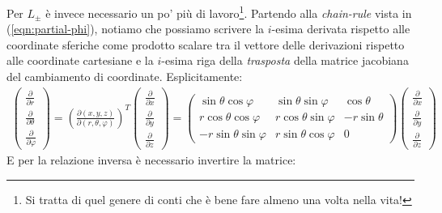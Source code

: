 \documentclass[../../FisicaTeorica.tex]{subfiles}
\begin{document}
Per $L_{\pm}$ è invece necessario un po' più di lavoro\footnote{Si tratta di quel genere di conti che è bene fare almeno una volta nella vita!}. Partendo alla \textit{chain-rule} vista in (\ref{eqn:partial-phi}), notiamo che possiamo scrivere la $i$-esima derivata rispetto alle coordinate sferiche come prodotto scalare tra il vettore delle derivazioni rispetto alle coordinate cartesiane e la $i$-esima riga della \textit{trasposta} della matrice jacobiana del cambiamento di coordinate. Esplicitamente:
\begin{align*}
\begin{pmatrix}
\frac{\partial}{\partial r}\\
\frac{\partial}{\partial \theta}\\
\frac{\partial}{\partial \varphi}
\end{pmatrix} = \left(\frac{\partial (x,y,z)}{\partial (r,\theta,\varphi)}\right)^T\begin{pmatrix}
\frac{\partial}{\partial x}\\
\frac{\partial}{\partial y}\\
\frac{\partial}{\partial z}
\end{pmatrix}= 
\begin{pmatrix}
\sin\theta \cos\varphi & \sin\theta\sin\varphi & \cos\theta\\
r\cos\theta \cos\varphi & r\cos\theta \sin\varphi & - r\sin\theta\\
-r\sin\theta \sin\varphi & r\sin\theta\cos\varphi & 0
\end{pmatrix}
\begin{pmatrix}
\frac{\partial}{\partial x}\\
\frac{\partial}{\partial y}\\
\frac{\partial}{\partial z}
\end{pmatrix}
\end{align*}
E per la relazione inversa è necessario invertire la matrice:
\end{document}
